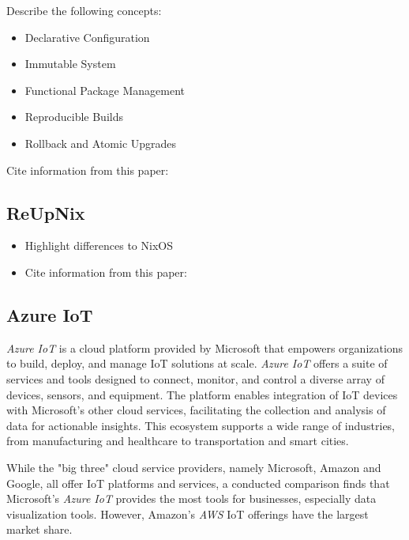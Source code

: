 \begin{tcolorbox}[title=TODO]
Describe the following concepts:
\begin{itemize}
    \item Declarative Configuration
    \item Immutable System
    \item Functional Package Management
    \item Reproducible Builds
    \item Rollback and Atomic Upgrades
\end{itemize}

    Cite information from this paper: \cite{1411255}
\end{tcolorbox}

\subsection{ReUpNix}

\begin{tcolorbox}[title=TODO]
    \begin{itemize}
        \item Highlight differences to NixOS
        \item Cite information from this paper: \cite{gollenstede:23:lctes}
    \end{itemize}
\end{tcolorbox}


\subsection{Azure IoT}
\textit{Azure IoT} is a cloud platform provided by Microsoft that
empowers organizations to build, deploy, and manage \ac{IoT} solutions at scale.
\textit{Azure IoT} offers a suite of services and tools designed to connect,
monitor, and control a diverse array of devices, sensors, and equipment. The
platform enables integration of \ac{IoT} devices with Microsoft's other cloud
services, facilitating the collection and analysis of data for actionable insights.
This ecosystem supports a wide range of industries, from manufacturing and
healthcare to transportation and smart cities\cite{msdoc-aziot}.

While the "big three" cloud service providers, namely Microsoft, Amazon and
Google, all offer \ac{IoT} platforms and services, a conducted comparison finds
that Microsoft's \textit{Azure IoT} provides the most tools for businesses,
especially data visualization tools. However, Amazon's \textit{AWS} \ac{IoT}
offerings have the largest market share\cite{9116254}.

